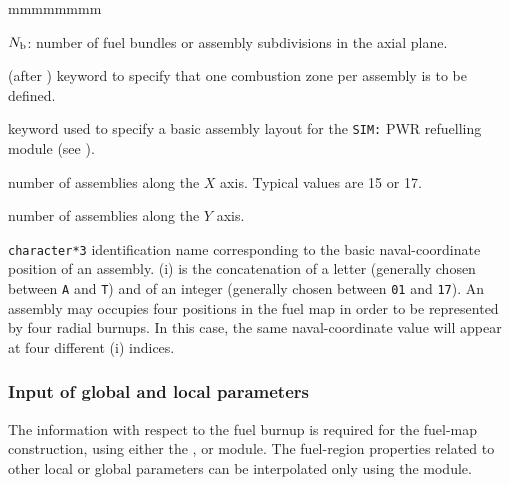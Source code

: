\begin{ListeDeDescription}{mmmmmmmm}
\item[\dusa{nb}] $N_{\rm b}$: number of fuel bundles or assembly subdivisions in the axial plane.

\item[\moc{ASBLY}] (after ) keyword to specify that one combustion zone per assembly is to be defined.

\item[\moc{SIM}] keyword used to specify a basic assembly layout for the {\tt SIM:} PWR refuelling module (see ).

\item[\dusa{lx}] number of assemblies along the $X$ axis. Typical values are 15 or 17.

\item[\dusa{ly}] number of assemblies along the $Y$ axis.

\item[\dusa{naval}] \texttt{character*3} identification name corresponding to the basic naval-coordinate position of an assembly. (i) is the
concatenation of a letter (generally chosen between {\tt A} and {\tt T}) and of an integer (generally chosen between {\tt 01}
and {\tt 17}). An assembly may occupies four positions in the fuel map in order to be represented by four radial burnups. In
this case, the same naval-coordinate value will appear at four different (i) indices.

\end{ListeDeDescription}

\vskip 0.2cm
\subsubsection{Input of global and local parameters}\label{sect:resiniaram}

\noindent
The information with respect to the fuel burnup is required for the fuel-map 
construction, using either the ,  or  module. The fuel-region properties
related to other local or global parameters can be interpolated only using the  module.


